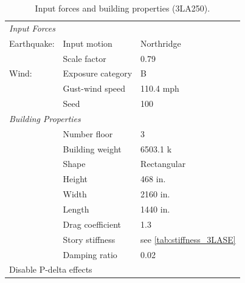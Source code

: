 \documentclass{simcenterdocumentation}
\begin{document}
\begin{table}[H]
	\centering \caption{Input forces and building properties (3LA250).}
	\begin{tabular}{lll}
	\toprule
	\multicolumn{3}{l}{\textit{Input Forces}}					\\
	\cmidrule(rl){1-3}
	Earthquake:		& Input motion		& Northridge			\\
					& Scale factor		& 0.79					\\
	Wind:			& Exposure category	& B						\\
					& Gust-wind speed	& 110.4 mph				\\
					& Seed				& 100					\\
	\midrule
	\multicolumn{3}{l}{\textit{Building Properties}}			\\
	\cmidrule(rl){1-3}
					& Number floor		& 3						\\
					& Building weight	& 6503.1 k				\\
					& Shape				& Rectangular			\\
					& Height			& 468 in.				\\
					& Width				& 2160 in.				\\
					& Length			& 1440 in.				\\
					& Drag coefficient	& 1.3					\\
					& Story stiffness	& see \cref{tab:stiffness_3LASE}				\\
					& Damping ratio		& 0.02					\\
	\midrule
	\multicolumn{3}{l}{Disable P-delta effects}					\\
	\bottomrule
	\end{tabular}
\end{table}
\end{document}

